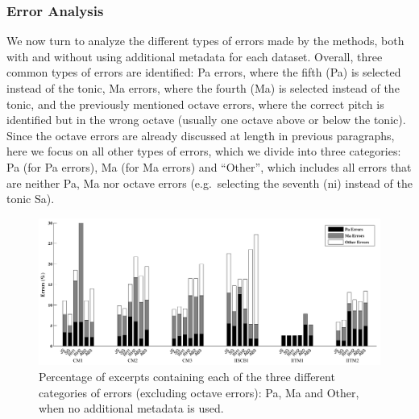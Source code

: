 {{\subsubsection{Error Analysis}
\label{sec:pre_processing_tonic_identification_error_analysis}

We now turn to analyze the different types of errors made by the methods, both with and without using additional metadata for each dataset. Overall, three common types of errors are identified: Pa errors, where the fifth (Pa) is selected instead of the tonic, Ma errors, where the fourth (Ma) is selected instead of the tonic, and the previously mentioned octave errors, where the correct pitch is identified but in the wrong octave (usually one octave above or below the
tonic). Since the octave errors are already discussed at length in previous paragraphs, here we focus on all other types of errors, which we divide into three categories: Pa (for Pa errors), Ma (for Ma errors) and ``Other'', which includes all errors that are neither Pa, Ma nor octave errors (e.g.~selecting the seventh (\acrshort{ni}) instead of the tonic Sa).


\begin{figure}
	\begin{center}
		\includegraphics[width=\figSizeHundred]{ch05_preprocessing/figures/ErrorAnalysis_Without_MF.pdf}
	\end{center}
	\caption{Percentage of excerpts containing each of the three different
		categories of errors (excluding octave errors): Pa, Ma and Other, when no additional metadata is used.}
	\label{fig:tonic_identification_errors_without_MF}
\end{figure}

}}
